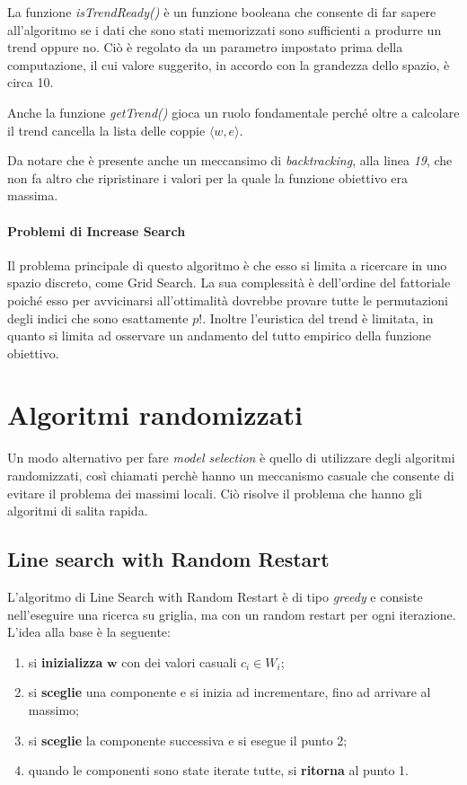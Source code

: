 La funzione \textit{isTrendReady()} è un funzione booleana
che consente di far sapere all'algoritmo se i dati che sono stati memorizzati
sono sufficienti a produrre un trend oppure no. Ciò è regolato da un
parametro impostato prima della computazione, il cui valore
suggerito, in accordo con la grandezza dello spazio, è circa 10.

Anche la funzione \textit{getTrend()} gioca un ruolo fondamentale
perché oltre a calcolare il trend cancella la lista delle coppie
$\langle w, e\rangle$.

Da notare che è presente anche un meccansimo di \textit{backtracking},
alla linea \textit{19}, che non fa altro che ripristinare
i valori per la quale la funzione obiettivo era massima.

\paragraph{Problemi di Increase Search}
Il problema principale di questo algoritmo è che esso si limita a ricercare
in uno spazio discreto, come Grid Search. La sua complessità è dell'ordine
del fattoriale poiché esso per avvicinarsi all'ottimalità dovrebbe
provare tutte le permutazioni degli indici che sono esattamente $p!$.
Inoltre l'euristica del trend è limitata, in quanto si limita
ad osservare un andamento del tutto empirico della funzione obiettivo.

\section{Algoritmi randomizzati}
Un modo alternativo per fare \textit{model selection} è quello di utilizzare degli algoritmi randomizzati,
così chiamati perchè hanno un meccanismo casuale che consente di evitare
il problema dei massimi locali. Ciò risolve il problema che hanno gli algoritmi di salita rapida.

\subsection{Line search with Random Restart}
L'algoritmo di Line Search with Random Restart è di tipo \textit{greedy} e consiste nell'eseguire
una ricerca su griglia, ma con un random restart per ogni iterazione.
L'idea alla base è la seguente:

\begin{enumerate}
	\item si \textbf{inizializza} $\boldsymbol{w}$ con dei valori casuali $c_i \in W_i$;
	\item si \textbf{sceglie} una componente e si inizia ad incrementare, fino ad arrivare al massimo;
	\item si \textbf{sceglie} la componente successiva e si esegue il punto 2;
	\item quando le componenti sono state iterate tutte, si \textbf{ritorna} al punto 1.
\end{enumerate}

